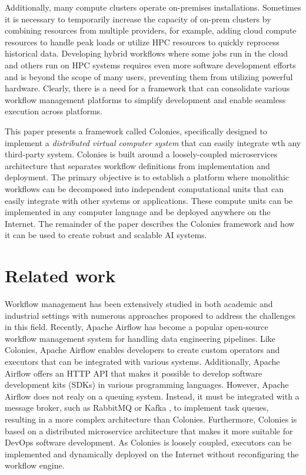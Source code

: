 \documentclass{article}
\begin{document}
Additionally, many compute clusters operate on-premises installations. Sometimes it is necessary to temporarily increase the capacity of on-prem clusters by combining resources from multiple providers, for example, adding cloud compute resources to handle peak loads or utilize HPC resources to quickly reprocess historical data. Developing hybrid workflows where some jobs run in the cloud and others run on HPC systems requires even more software development efforts \cite{wf_challenges} and is beyond the scope of many users, preventing them from utilizing powerful hardware. Clearly, there is a need for a framework that can consolidate various workflow management platforms to simplify development and enable seamless execution across platforms.

This paper presents a framework called Colonies, specifically designed to implement a \emph{distributed virtual computer system} that can easily integrate wth any third-party system. Colonies is built around a loosely-coupled microservices architecture that separates workflow definitions from implementation and deployment. The primary objective is to establish a platform where monolithic workflows can be decomposed into independent computational units that can easily integrate with other systems or applications. These compute units can be implemented in any computer language and be deployed anywhere on the Internet. The remainder of the paper describes the Colonies framework and how it can be used to create robust and scalable AI systems. 

\section{Related work}
Workflow management has been extensively studied in both academic and industrial settings with numerous approaches \cite{service_wfs, schmitt2022workflow, GarciaRepresa1740746, Ouyang2010, NIKOLOV2021100440, workflow_in_bigdata} proposed to address the challenges in this field. Recently, Apache Airflow \cite{apache_airflow} has become a popular open-source workflow management system for handling data engineering pipelines. Like Colonies, Apache Airflow enables developers to create custom operators and executors that can be integrated with various systems. Additionally, Apache Airflow offers an HTTP API that makes it possible to develop software development kits (SDKs) in various programming languages. However, Apache Airflow does not realy on a queuing system. Instead, it must be integrated with a message broker, such as RabbitMQ \cite{rabbitmq} or Kafka \cite{apache_kafka}, to implement task queues, resulting in a more complex architecture than Colonies. Furthermore, Colonies is based on a distributed microservice architecture that makes it more suitable for DevOps software development. As Colonies is loosely coupled, executors can be implemented and dynamically deployed on the Internet without reconfiguring the workflow engine.
\end{document}
